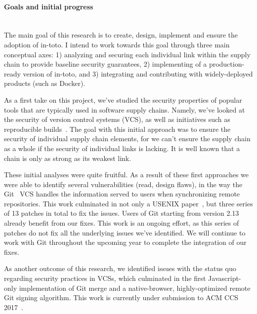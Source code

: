\paragraph{Goals and initial progress}\mbox{}\\

The main goal of this research is to create, design, implement and ensure the
adoption of in-toto. I intend to work towards this goal through three main
conceptual axes: 1) analyzing and securing each individual link within the
supply chain to provide baseline security guarantees, 2) implementing of a
production-ready version of in-toto, and 3) integrating and contributing with
widely-deployed products (such as Docker).

As a first take on this project, we've studied the security properties of
popular tools that are typically used in software supply chains. Namely, we've looked at the
security of version control systems (VCS), as well as initiatives such as
reproducible builds~\cite{reprobuilds}. The goal with this initial approach was to ensure the
security of individual supply chain elements, for we can't ensure the supply
chain as a whole if the security of individual links is lacking. It is well
known that a chain is only as strong as its weakest link.

These initial analyses were quite fruitful. As a result of these first
approaches we were able to identify several vulnerabilities (read, design
flaws), in the way the Git~\cite{git} VCS handles the information served to
users when synchronizing remote repositories. This work culminated in not only
a USENIX paper~\cite{torres2016omitting}, but three series of 13 patches in total to fix the issues.
Users of Git starting from version 2.13~\cite{git-commits-santiago, git-commits-lukas, git-213-contributors} already benefit from our
fixes. This work is an ongoing effort, as this series of patches do not fix all
the underlying issues we've identified. We will continue to work with Git throughout the upcoming year to complete the integration of our fixes.

As another outcome of this research, we identified issues with the status quo
regarding security practices in VCSs, which culminated in the first
Javascript-only implementation of Git merge and a native-browser,
highly-optimized remote Git signing algorithm. This work is currently under
submission to ACM CCS 2017~\cite{ACMCCS2017}. 

